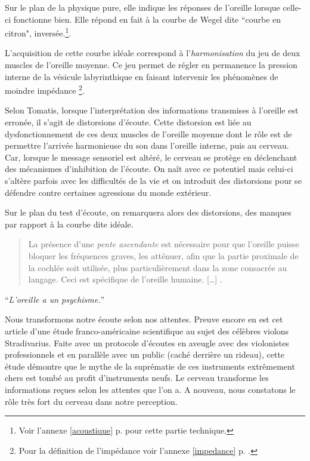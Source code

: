 Sur le plan de la physique pure, elle indique les réponses de l'oreille
lorsque celle-ci fonctionne bien. Elle répond en fait à la courbe
de Wegel dite ``courbe en citron", inversée.\footnote{%
		Voir l'annexe \ref{acoustique} p. \pageref{acoustique}
		 pour cette partie technique.}.

L'acquisition de cette courbe idéale correspond à l'\textsl{harmonisation}
du jeu de deux muscles de l'oreille moyenne. Ce jeu
permet de régler en permanence la pression interne de la vésicule
labyrinthique en faisant intervenir les phénomènes de moindre impédance%
\footnote{Pour la définition de l'impédance voir l'annexe \ref{impedance} 
	p. \pageref{impedance}.}.
 



Selon Tomatis, lorsque l'interprétation des informations transmises à l'oreille est erronée, il s'agit de
distorsions d'écoute. Cette distorsion est liée au dysfonctionnement
de ces deux muscles de l'oreille moyenne dont le rôle est de permettre l'arrivée
harmonieuse du son dans l'oreille interne, puis au cerveau. Car, lorsque
le message sensoriel est altéré, le cerveau se protège en déclenchant
des mécanismes d'inhibition de l'écoute. On naît
avec ce potentiel mais celui-ci s'altère parfois avec les difficultés
de la vie et on introduit des distorsions
pour se défendre contre certaines agressions du monde extérieur. 

Sur le plan du test d'écoute, on remarquera
alors des distorsions, des manques par rapport à la courbe dite 
idéale.

\blockquote{La présence d'une \emph{pente ascendante} est nécessaire pour que
l'oreille puisse bloquer les fréquences graves, les atténuer, afin
que la partie proximale de la cochlée soit utilisée, plus particulièrement
dans la zone consacrée au langage. Ceci est spécifique de l'oreille
humaine.  [\dots] \autocite{auriol_stress}. }

\enquote{\emph{L'oreille a un psychisme\autocite[correct? p.?]{tomatis:loreille}.}} 





Nous transformons notre écoute selon nos attentes. Preuve encore en est cet article d'une étude franco-américaine scientifique
\autocite{fritz_stradivarius} au sujet des célèbres violons Stradivarius. Faite avec un protocole d'écoutes en aveugle avec
des violonistes professionnels et en parallèle avec un public (caché
derrière un rideau), cette étude démontre que le mythe de la suprématie
de ces instruments extrêmement chers est tombé au profit d'instruments
neufs. Le cerveau transforme les informations reçues
selon les attentes que l'on a. A nouveau, nous constatons le rôle très fort du cerveau dans notre perception.

